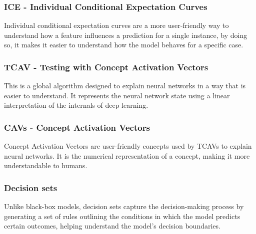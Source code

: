 \documentclass[10pt,journal,compsoc]{IEEEtran}
\begin{document}
\subsubsection{ICE - Individual Conditional Expectation Curves}
Individual conditional expectation curves are a more user-friendly way to understand how a feature influences a prediction for a single instance, by doing so, it makes it easier to understand how the model behaves for a specific case.

\subsubsection{TCAV - Testing with Concept Activation Vectors}
This is a global algorithm designed to explain neural networks in a way that is easier to understand. It represents the neural network state using a linear interpretation of the internals of deep learning.

\subsubsection{CAVs - Concept Activation Vectors}
Concept Activation Vectors are user-friendly concepts used by TCAVs to explain neural networks. It is the numerical representation of a concept, making it more understandable to humans.

\subsubsection{Decision sets}
Unlike black-box models, decision sets capture the decision-making process by generating a set of rules outlining the conditions in which the model predicts certain outcomes, helping understand the model's decision boundaries.
\end{document}
